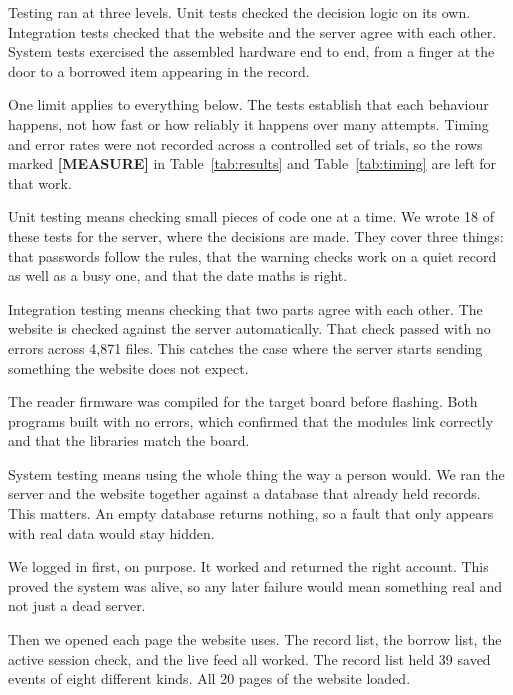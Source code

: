 
Testing ran at three levels. Unit tests checked the decision logic on its own.
Integration tests checked that the website and the server agree with each other.
System tests exercised the assembled hardware end to end, from a finger at the
door to a borrowed item appearing in the record.

One limit applies to everything below. The tests establish that each behaviour
happens, not how fast or how reliably it happens over many attempts. Timing and
error rates were not recorded across a controlled set of trials, so the rows
marked \textbf{[MEASURE]} in Table~\ref{tab:results} and
Table~\ref{tab:timing} are left for that work.


Unit testing means checking small pieces of code one at a time. We wrote 18 of
these tests for the server, where the decisions are made. They cover three
things: that passwords follow the rules, that the warning checks work on a quiet
record as well as a busy one, and that the date maths is right.

Integration testing means checking that two parts agree with each other. The
website is checked against the server automatically. That check passed with no
errors across 4{,}871 files. This catches the case where the server starts
sending something the website does not expect.

The reader firmware was compiled for the target board before flashing. Both
programs built with no errors, which confirmed that the modules link correctly
and that the libraries match the board.


System testing means using the whole thing the way a person would. We ran the
server and the website together against a database that already held records.
This matters. An empty database returns nothing, so a fault that only appears
with real data would stay hidden.

We logged in first, on purpose. It worked and returned the right account. This
proved the system was alive, so any later failure would mean something real and
not just a dead server.

Then we opened each page the website uses. The record list, the borrow list, the
active session check, and the live feed all worked. The record list held 39
saved events of eight different kinds. All 20 pages of the website loaded.

